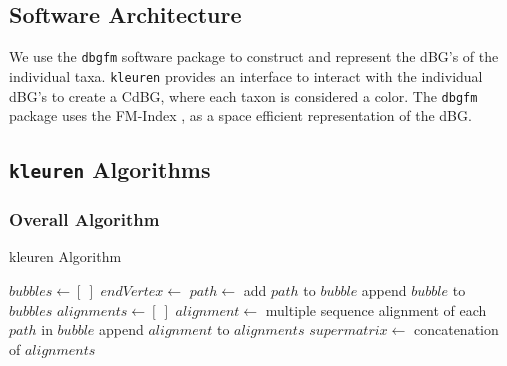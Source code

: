 \documentclass[hidelinks, 10pt, conference, compsocconf]{IEEEtran}
\begin{document}
\subsection{Software Architecture}

We use the \texttt{dbgfm} software package \cite{dbgfm} to construct and represent the dBG's of the individual taxa.
\texttt{kleuren} provides an interface to interact with the individual dBG's to create a CdBG, where each taxon is considered a color.
The \texttt{dbgfm} package uses the FM-Index \cite{FM-Index}, as a space efficient representation of the dBG.

\subsection{\texttt{kleuren} Algorithms}

\subsubsection{Overall Algorithm}\label{overall}

\begin{algorithm}
\caption{kleuren Algorithm}\label{overallAlg}
\begin{algorithmic}[1]
    	\State $bubbles \gets \left[ \ \right]$ 
            	\State $endVertex \gets$ 
                	\State $path \gets$ 
                    \State add $path$ to $bubble$
                \EndFor
                \State append $bubble$ to $bubbles$
            \EndIf
        \EndFor
        \State $alignments \gets \left[ \ \right]$  
        	\State $alignment \gets$ multiple sequence alignment of each $path$ in $bubble$
            \State append $alignment$ to $alignments$
        \EndFor
        \State $supermatrix \gets$ concatenation of $alignments$
    \EndFunction
\end{algorithmic}
\end{algorithm}
\end{document}
